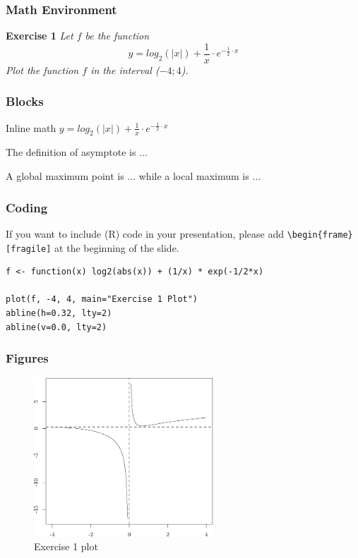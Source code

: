 \documentclass[11pt, xcolor=dvipsnames]{beamer}
\begin{document}
\begin{frame}
\frametitle{Math Environment}
\textbf{Exercise 1}
\textit{Let $f$ be the function}
	\begin{equation}
		y = log_2(|x|) + \frac{1}{x} \cdot e^{-\frac{1}{2} \cdot x}
	\label{equation-1}
	\end{equation}
	\textit{Plot the function $f$ in the interval ($-4; 4$).}
\end{frame}

\begin{frame}[fragile]
\frametitle{Blocks}
\begin{Example}
	Inline math $y = log_2(|x|) + \frac{1}{x} \cdot e^{-\frac{1}{2} \cdot x}$
\end{Example}
\pause
\begin{definition}
The definition of asymptote is $\hdots$
\end{definition}
\pause
\begin{theorem}
	A global maximum point is $\hdots$ while a local maximum is $\hdots$
\end{theorem}
\end{frame}

\begin{frame}[fragile]
\frametitle{Coding}
If you want to include (\textsf{R}) code in your presentation, please add \texttt{\textbackslash begin\{frame\}[fragile]} at the beginning of the slide. \bigskip
\begin{lstlisting}
f <- function(x) log2(abs(x)) + (1/x) * exp(-1/2*x)

plot(f, -4, 4, main="Exercise 1 Plot")
abline(h=0.32, lty=2)
abline(v=0.0, lty=2)
\end{lstlisting} 
\end{frame}

\begin{frame}
\frametitle{Figures}
\bigskip
\begin{figure}
\centering
\includegraphics[width=0.6\textwidth]{Figure_1.pdf}
\caption{Exercise 1 plot}
\label{Exercise-1}	
\end{figure}
\end{frame}
\end{document}
